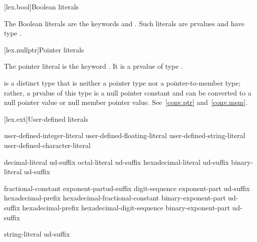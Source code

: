 [lex.bool]{Boolean literals}

%
\begin{bnf}
\br
    \br
\end{bnf}

\pnum
{}%
The Boolean literals are the keywords  and .
Such literals are prvalues and have type .

[lex.nullptr]{Pointer literals}

%
\begin{bnf}
\br
\end{bnf}

\pnum
The pointer literal is the keyword . It is a prvalue of type
.
\begin{note}
 is a distinct type that is neither a pointer type nor a pointer-to-member type;
rather, a prvalue of this type is a null pointer constant and can be
converted to a null pointer value or null member pointer value. See~\ref{conv.ptr}
and~\ref{conv.mem}.
\end{note}

[lex.ext]{User-defined literals}

%
\begin{bnf}
\br
    user-defined-integer-literal\br
    user-defined-floating-literal\br
    user-defined-string-literal\br
    user-defined-character-literal
\end{bnf}

\begin{bnf}
\br
    decimal-literal ud-suffix\br
    octal-literal ud-suffix\br
    hexadecimal-literal ud-suffix\br
    binary-literal ud-suffix
\end{bnf}

\begin{bnf}
\br
    fractional-constant exponent-part\opt ud-suffix\br
    digit-sequence exponent-part ud-suffix\br
    hexadecimal-prefix hexadecimal-fractional-constant binary-exponent-part ud-suffix\br
    hexadecimal-prefix hexadecimal-digit-sequence binary-exponent-part ud-suffix
\end{bnf}

\begin{bnf}
\br
    string-literal ud-suffix
\end{bnf}

